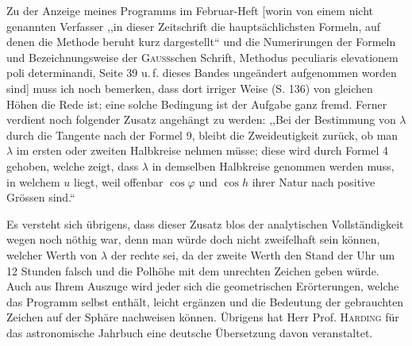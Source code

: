 \par\indent Zu der Anzeige meines Programms im Februar-Heft [worin von einem nicht genannten Verfasser ,,in dieser Zeitschrift die hauptsächlichsten Formeln, auf denen die Methode beruht kurz dargestellt“ und die Numerirungen der Formeln und Bezeichnungsweise der \textsc{Gauss}schen Schrift, Methodus peculiaris elevationem poli determinandi, Seite 39 u.\,f. dieses Bandes ungeändert aufgenommen worden sind] muss ich noch bemerken, dass dort irriger Weise (S. 136) von gleichen Höhen die Rede ist; eine solche Bedingung ist der Aufgabe ganz fremd. Ferner verdient noch folgender Zusatz angehängt zu werden: ,,Bei der Bestimmung von $\lambda$ durch die Tangente nach der Formel 9, bleibt die Zweideutigkeit zurück, ob man $\lambda$ im ersten oder zweiten Halbkreise nehmen müsse; diese wird durch Formel 4 gehoben, welche zeigt, dass $\lambda$ in demselben Halbkreise genommen werden muss, in welchem $u$ liegt, weil offenbar $\cos\varphi$ und $\cos h$ ihrer Natur nach positive Grössen sind.“

\par\indent Es versteht sich übrigens, dass dieser Zusatz blos der analytischen Vollständigkeit wegen noch nöthig war, denn man würde doch nicht zweifelhaft sein können, welcher Werth von $\lambda$ der rechte sei, da der zweite Werth den Stand der Uhr um 12 Stunden falsch und die Polhöhe mit dem unrechten Zeichen geben würde. Auch aus Ihrem Auszuge wird jeder sich die geometrischen Erörterungen, welche das Programm selbst enthält, leicht ergänzen und die Bedeutung der gebrauchten Zeichen auf der Sphäre nachweisen können. Übrigens hat Herr Prof. \textsc{Harding} für das astronomische Jahrbuch eine deutsche Übersetzung davon veranstaltet.
